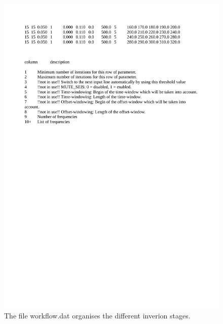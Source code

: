 \begin{figure}[h!]
\begin{center}
\includegraphics[width=\textwidth]{fig/workflow_input}
\caption[Workflow.dat]{The file workflow.dat organises the different inverion stages.}\label{fig:workflow_input}
\end{center}
\end{figure}
